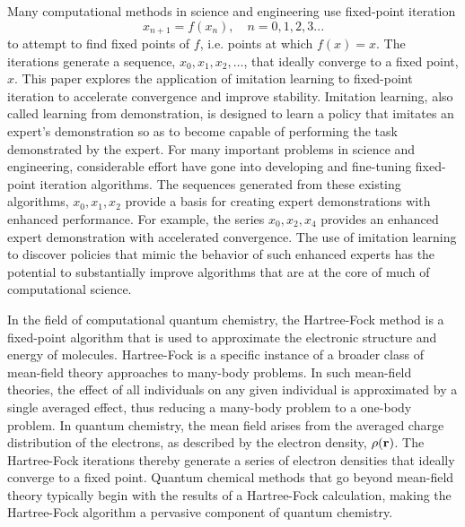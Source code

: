 \documentclass[twoside,11pt]{article}
\begin{document}
Many computational methods in science and engineering use fixed-point iteration
\[
x_{n+1} = f(x_n), \quad n = 0,1,2,3...
\]
to attempt to find fixed points of $f$, i.e. points at which $f(x)=x$. The iterations generate a sequence, $x_0, x_1, x_2, \ldots$, that ideally converge to a fixed point, $x$. This paper explores the application of imitation learning to fixed-point iteration to accelerate convergence and improve stability. Imitation learning, also called learning from demonstration, is designed to learn a policy that imitates an expert's demonstration so as to become capable of performing the task demonstrated by the expert. For many important problems in science and engineering, considerable effort have gone into developing and fine-tuning fixed-point iteration algorithms. The sequences generated from these existing algorithms, $x_0, x_1, x_2$  provide a basis for creating expert demonstrations with enhanced performance. For example, the series $x_0, x_2, x_4$ provides an enhanced expert demonstration with accelerated convergence. The use of imitation learning to discover policies that mimic the behavior of such enhanced experts has the potential to substantially improve algorithms that are at the core of much of computational science.

In the field of computational quantum chemistry, the Hartree-Fock method is a fixed-point algorithm that is used to approximate the electronic structure and energy of molecules. Hartree-Fock is a specific instance of a broader class of mean-field theory approaches to many-body problems. In such mean-field theories, the effect of all individuals on any given individual is approximated by a single averaged effect, thus reducing a many-body problem to a one-body problem. In quantum chemistry, the mean field arises from the averaged charge distribution of the electrons, as described by the electron density, $\rho({\bf r})$. The Hartree-Fock iterations thereby generate a series of electron densities that ideally converge to a fixed point. Quantum chemical methods that go beyond mean-field theory typically begin with the results of a Hartree-Fock calculation, making the Hartree-Fock algorithm a pervasive component of quantum chemistry.\cite{Some authoritative review of electronic-structure theory}
\end{document}
